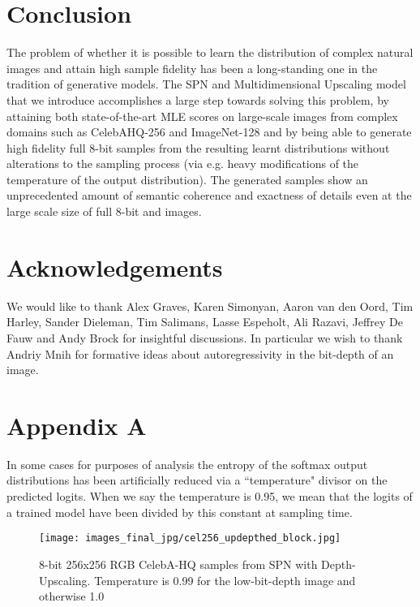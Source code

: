 \documentclass{article} \usepackage{iclr2019_conference,times}
\begin{document}
\section{Conclusion}

The problem of whether it is possible to learn the distribution of complex natural images and attain high sample fidelity has been a long-standing one in the tradition of generative models. The SPN and Multidimensional Upscaling model that we introduce accomplishes a large step towards solving this problem, by attaining both state-of-the-art MLE scores on large-scale images from complex domains such as CelebAHQ-256 and ImageNet-128 and by being able to generate high fidelity full 8-bit samples from the resulting learnt distributions without alterations to the sampling process (via e.g. heavy modifications of the temperature of the output distribution). The generated samples show an unprecedented amount of  semantic coherence and exactness of details even at the large scale size of full 8-bit  and  images.

\section{Acknowledgements}

We would like to thank Alex Graves, Karen Simonyan, Aaron van den Oord, Tim Harley, Sander Dieleman, Tim Salimans, Lasse Espeholt, Ali Razavi, Jeffrey De Fauw and Andy Brock for insightful discussions. In particular we wish to thank Andriy Mnih for formative ideas about autoregressivity in the bit-depth of an image.




\section*{Appendix A}

In some cases for purposes of analysis the entropy of the softmax output distributions has been artificially reduced via a ``temperature" divisor on the predicted logits. When we say the temperature is 0.95, we mean that the logits of a trained model have been divided by this constant at sampling time.

\begin{figure}[h]
  \begin{center}
    \texttt{[image: images\_final\_jpg/cel256\_updepthed\_block.jpg]}
    \caption{8-bit 256x256 RGB CelebA-HQ samples from SPN with Depth-Upscaling. Temperature is 0.99 for the low-bit-depth image and otherwise 1.0}
    \label{fig:cel256_updepthed}
  \end{center}
\end{figure}
\end{document}

